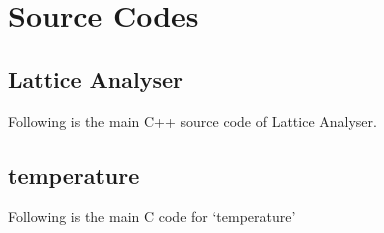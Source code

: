 \chapter{Source Codes}

\section{Lattice Analyser}\label{latticeAnalyserMain}
	Following is the main C++ source code of Lattice Analyser.
	

\section{temperature}\label{temperatureMain}
	Following is the main C code for `temperature'
	
